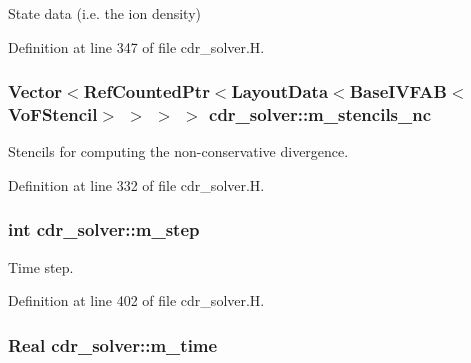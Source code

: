 State data (i.\+e. the ion density) 



Definition at line 347 of file cdr\+\_\+solver.\+H.

\subsubsection[{\texorpdfstring{m\+\_\+stencils\+\_\+nc}{m_stencils_nc}}]{\setlength{\rightskip}{0pt plus 5cm}Vector$<$Ref\+Counted\+Ptr$<$Layout\+Data$<$Base\+I\+V\+F\+AB$<$Vo\+F\+Stencil$>$ $>$ $>$ $>$ cdr\+\_\+solver\+::m\+\_\+stencils\+\_\+nc\hspace{0.3cm}{\ttfamily [protected]}}\hypertarget{classcdr__solver_ab4825a310de1071036eb9a94d08912fe}{}\label{classcdr__solver_ab4825a310de1071036eb9a94d08912fe}


Stencils for computing the non-\/conservative divergence. 



Definition at line 332 of file cdr\+\_\+solver.\+H.

\subsubsection[{\texorpdfstring{m\+\_\+step}{m_step}}]{\setlength{\rightskip}{0pt plus 5cm}int cdr\+\_\+solver\+::m\+\_\+step\hspace{0.3cm}{\ttfamily [protected]}}\hypertarget{classcdr__solver_a8e8c679e6e0ccd9c4fc2320be138ec4b}{}\label{classcdr__solver_a8e8c679e6e0ccd9c4fc2320be138ec4b}


Time step. 



Definition at line 402 of file cdr\+\_\+solver.\+H.

\subsubsection[{\texorpdfstring{m\+\_\+time}{m_time}}]{\setlength{\rightskip}{0pt plus 5cm}Real cdr\+\_\+solver\+::m\+\_\+time\hspace{0.3cm}{\ttfamily [protected]}}\hypertarget{classcdr__solver_a95de10e60f0e15883eff645bac2ebe37}{}\label{classcdr__solver_a95de10e60f0e15883eff645bac2ebe37}


